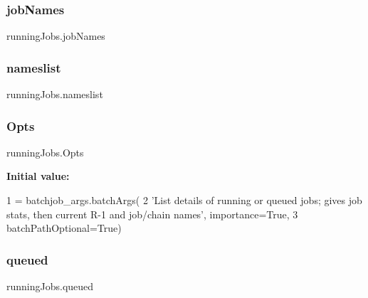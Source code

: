 \mbox{\label{namespacerunningJobs_a0a0a08b270feb5c19bc21bfcd276ee9f}} 
\subsubsection{\texorpdfstring{job\+Names}{jobNames}}
{\footnotesize\ttfamily running\+Jobs.\+job\+Names}

\mbox{\label{namespacerunningJobs_ac9fe5d5b9c8e3a015df8424ca0dc772a}} 
\subsubsection{\texorpdfstring{nameslist}{nameslist}}
{\footnotesize\ttfamily running\+Jobs.\+nameslist}

\mbox{\label{namespacerunningJobs_af3294b73085a8cb379dd4f4a1ff77e1d}} 
\subsubsection{\texorpdfstring{Opts}{Opts}}
{\footnotesize\ttfamily running\+Jobs.\+Opts}

{\bfseries Initial value\+:}
\begin{DoxyCode}
1 =  batchjob\_args.batchArgs(
2     \textcolor{stringliteral}{'List details of running or queued jobs; gives job stats, then current R-1 and job/chain names'}, 
      importance=\textcolor{keyword}{True},
3     batchPathOptional=\textcolor{keyword}{True})
\end{DoxyCode}
\mbox{\label{namespacerunningJobs_a3f9507bb3b4cff54b761a2743acf119d}} 
\subsubsection{\texorpdfstring{queued}{queued}}
{\footnotesize\ttfamily running\+Jobs.\+queued}

